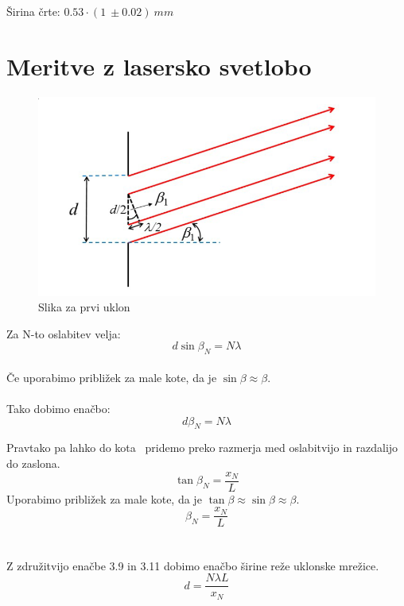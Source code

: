 \documentclass{report}
\begin{document}
\begin{centering}
  Širina črte: $0.53 \cdot (1 \ \pm 0.02) \ mm$
\end{centering}




\pagebreak
\section{Meritve z lasersko svetlobo}

\begin{figure}[H]
  \caption{Slika za prvi uklon}
  \label{fig:graf}
  \includegraphics[width=\textwidth]{uklonska_mrezica}
\end{figure}

Za N-to oslabitev velja:\\
\begin{equation}
  d \sin{\beta_{N} = N \lambda}  
\end{equation}\\
Če uporabimo približek za male kote, da je $ \sin{\beta} \approx \beta$.
\\\\
Tako dobimo enačbo:
\begin{equation}
  d \beta_{N} = N \lambda  
\end{equation}

\noindent Pravtako pa lahko do kota \beta \ pridemo preko razmerja med oslabitvijo in
razdalijo do zaslona.\\
\begin{equation}
  \tan{\beta_{N}} = \frac{x_N}{L}  
\end{equation}
Uporabimo približek za male kote, da je $ \tan{\beta} \approx \sin{\beta} \approx \beta$.\\
\begin{equation}
  \beta_{N} = \frac{x_N}{L}  
\end{equation}\\\\
Z združitvijo enačbe 3.9 in 3.11 dobimo enačbo širine reže uklonske mrežice.
\begin{equation}
  d = \frac{N \lambda L}{x_{N}}
\end{equation}
\end{document}

